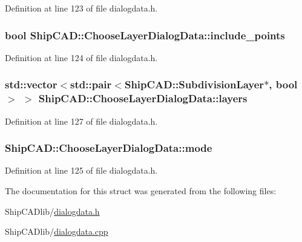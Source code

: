 Definition at line 123 of file dialogdata.\+h.

\subsubsection[{\texorpdfstring{include\+\_\+points}{include_points}}]{\setlength{\rightskip}{0pt plus 5cm}bool Ship\+C\+A\+D\+::\+Choose\+Layer\+Dialog\+Data\+::include\+\_\+points}\hypertarget{structShipCAD_1_1ChooseLayerDialogData_a24787e5e75c8a507eb02c5152dcf1209}{}\label{structShipCAD_1_1ChooseLayerDialogData_a24787e5e75c8a507eb02c5152dcf1209}


Definition at line 124 of file dialogdata.\+h.

\subsubsection[{\texorpdfstring{layers}{layers}}]{\setlength{\rightskip}{0pt plus 5cm}std\+::vector$<$std\+::pair$<${\bf Ship\+C\+A\+D\+::\+Subdivision\+Layer}$\ast$, bool$>$ $>$ Ship\+C\+A\+D\+::\+Choose\+Layer\+Dialog\+Data\+::layers}\hypertarget{structShipCAD_1_1ChooseLayerDialogData_abf3c16e3322c1f9b93822204dd2ee825}{}\label{structShipCAD_1_1ChooseLayerDialogData_abf3c16e3322c1f9b93822204dd2ee825}


Definition at line 127 of file dialogdata.\+h.

\subsubsection[{\texorpdfstring{mode}{mode}}]{ Ship\+C\+A\+D\+::\+Choose\+Layer\+Dialog\+Data\+::mode}\hypertarget{structShipCAD_1_1ChooseLayerDialogData_a02ef288b4786baafa763a397c6d5dc59}{}\label{structShipCAD_1_1ChooseLayerDialogData_a02ef288b4786baafa763a397c6d5dc59}


Definition at line 125 of file dialogdata.\+h.



The documentation for this struct was generated from the following files\+:\begin{DoxyCompactItemize}
\item 
Ship\+C\+A\+Dlib/\hyperlink{dialogdata_8h}{dialogdata.\+h}\item 
Ship\+C\+A\+Dlib/\hyperlink{dialogdata_8cpp}{dialogdata.\+cpp}\end{DoxyCompactItemize}
